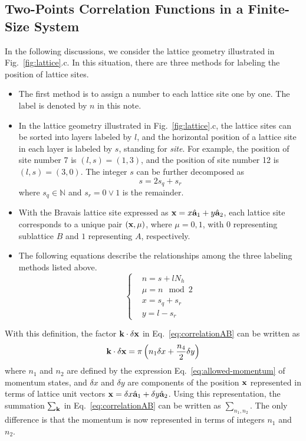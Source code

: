 \subsection{Two-Points Correlation Functions in a Finite-Size System}
In the following discussions, we consider the lattice geometry illustrated in Fig.~\ref{fig:lattice}.c. In this situation, there are three methods for labeling the position of lattice sites. 
\begin{itemize}
    \item The first method is to assign a number to each lattice site one by one. The label is denoted by $n$ in this note.
    
    \item In the lattice geometry illustrated in Fig.~\ref{fig:lattice}.c, the lattice sites can be sorted into layers labeled by $l$, and the horizontal position of a lattice site in each layer is labeled by $s$, standing for \textit{site}. For example, the position of site number 7 is $(l,s) = (1,3)$, and the position of site number 12 is $(l,s) = (3,0)$. The integer $s$ can be further decomposed as
    \[
    s = 2 s_q + s_r
    \]
    where $s_q \in \mathbb{N}$ and $s_r = 0\vee 1$ is the remainder.

    \item With the Bravais lattice site expressed as $\mathbf{x} = x\hat{\mathbf{a}}_1 + y\hat{\mathbf{a}}_2$, each lattice site corresponds to a unique pair $(\mathbf{x},\mu)$, where $\mu = 0,1$, with $0$ representing sublattice $B$ and $1$ representing $A$, respectively.

    \item The following equations describe the relationships among the three labeling methods listed above.
    \[
    \left\{
    \begin{aligned}
        & n = s + lN_h \\
        & \mu = n \mod{2}\\
        & x = s_q + s_r \\
        & y = l - s_r
    \end{aligned}
    \right.
    \]
\end{itemize}
With this definition, the factor $\mathbf{k}\cdot\delta\mathbf{x}$ in Eq.~\eqref{eq:correlationAB} can be written as
\[
\mathbf{k}\cdot\delta\mathbf{x} = \pi \left( n_1\delta x + \frac{n_4}{2}\delta y \right)
\]
where $n_1$ and $n_2$ are defined by the expression Eq.~\eqref{eq:allowed-momentum} of momentum states, and $\delta x$ and $\delta y$ are components of the position $\mathbf{x}$ represented in terms of lattice unit vectors $\mathbf{x} = \delta x \hat{\mathbf{a}}_1 + \delta y\hat{\mathbf{a}}_2$. Using this representation, the summation $\sum_{\mathbf{k}}$ in Eq.~\eqref{eq:correlationAB} can be written as $\sum_{n_1,n_2}$. The only difference is that the momentum is now represented in terms of integers $n_1$ and $n_2$.

